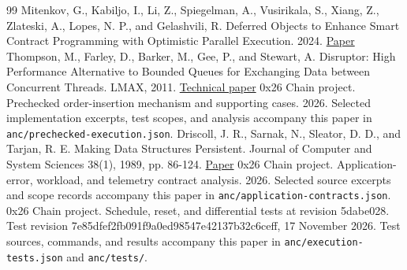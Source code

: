 \documentclass[11pt]{article}
\begin{document}
\begin{thebibliography}{99}
 Mitenkov, G., Kabiljo, I., Li, Z., Spiegelman, A., Vusirikala, S., Xiang, Z., Zlateski, A., Lopes, N. P., and Gelashvili, R. Deferred Objects to Enhance Smart Contract Programming with Optimistic Parallel Execution. 2024. \href{https://arxiv.org/abs/2405.06117v1}{Paper}
 Thompson, M., Farley, D., Barker, M., Gee, P., and Stewart, A. Disruptor: High Performance Alternative to Bounded Queues for Exchanging Data between Concurrent Threads. LMAX, 2011. \href{https://lmax-exchange.github.io/disruptor/disruptor.html}{Technical paper}
 0x26 Chain project. Prechecked order-insertion mechanism and supporting cases. 2026. Selected implementation excerpts, test scopes, and analysis accompany this paper in \texttt{anc/prechecked-execution.json}.
 Driscoll, J. R., Sarnak, N., Sleator, D. D., and Tarjan, R. E. Making Data Structures Persistent. Journal of Computer and System Sciences 38(1), 1989, pp. 86-124. \href{https://www.cs.cmu.edu/\textasciitilde{}sleator/papers/making-data-structures-persistent.pdf}{Paper}
 0x26 Chain project. Application-error, workload, and telemetry contract analysis. 2026. Selected source excerpts and scope records accompany this paper in \texttt{anc/application-contracts.json}.
 0x26 Chain project. Schedule, reset, and differential tests at revision 5dabe028. Test revision 7e85dfef2fb091f9a0ed98547e42137b32c6ceff, 17 November 2026. Test sources, commands, and results accompany this paper in \texttt{anc/execution-tests.json} and \texttt{anc/tests/}.
\end{thebibliography}
\end{document}
